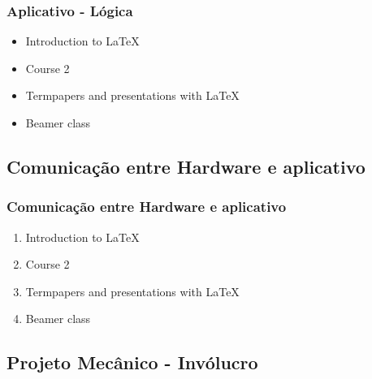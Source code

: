 \documentclass[hyperref={pdfpagelabels=false}]{beamer}
\begin{document}
                \begin{frame}\frametitle{Aplicativo - Lógica}
                    \begin{itemize}
                        \item Introduction to  \LaTeX \pause
                        \item Course 2 \pause
                        \item Termpapers and presentations with \LaTeX \pause
                        \item Beamer class
                    \end{itemize}
                \end{frame}

            \subsection{Comunicação entre Hardware e aplicativo}

                \begin{frame}\frametitle{Comunicação entre Hardware e aplicativo}
                    \begin{enumerate}
                        \item Introduction to  \LaTeX
                        \item Course 2
                        \item Termpapers and presentations with \LaTeX
                        \item Beamer class
                    \end{enumerate}
                \end{frame}

            \subsection{Projeto Mecânico - Invólucro}
\end{document}
